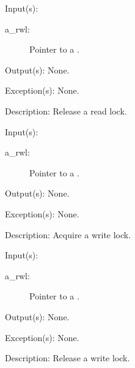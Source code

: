 \begin{capi}
	\begin{capilist}
	\item[Input(s): ]
		\begin{description}\item[]
		\item[a\_rwl: ]
			Pointer to a .
		\end{description}
	\item[Output(s): ] None.
	\item[Exception(s): ] None.
	\item[Description: ]
		Release a read lock.
	\end{capilist}
\label{rwl_wlock}
	\begin{capilist}
	\item[Input(s): ]
		\begin{description}\item[]
		\item[a\_rwl: ]
			Pointer to a \classname{rwl}.
		\end{description}
	\item[Output(s): ] None.
	\item[Exception(s): ] None.
	\item[Description: ]
		Acquire a write lock.
	\end{capilist}
\label{rwl_wunlock}
	\begin{capilist}
	\item[Input(s): ]
		\begin{description}\item[]
		\item[a\_rwl: ]
			Pointer to a .
		\end{description}
	\item[Output(s): ] None.
	\item[Exception(s): ] None.
	\item[Description: ]
		Release a write lock.
	\end{capilist}
\end{capi}
